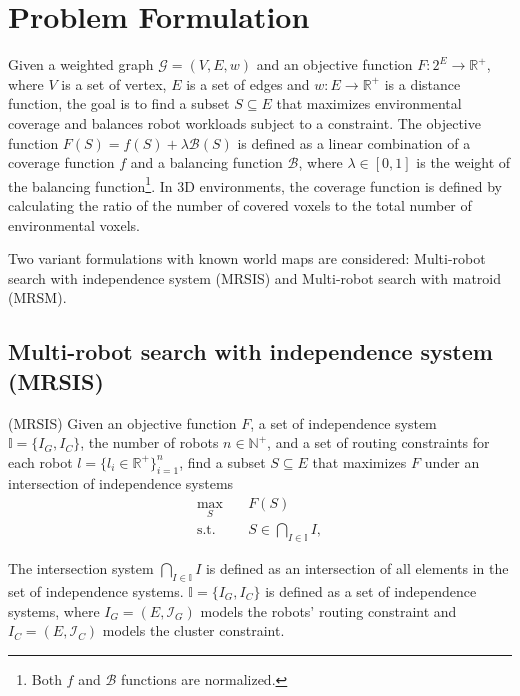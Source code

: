 \chapter{Problem Formulation}
Given a weighted graph $\mathcal{G}=(V, E, w)$ and an objective function $F:2^E \rightarrow \mathbb{R}^+$, where $V$ is a set of vertex, $E$ is a set of edges and $w:E \rightarrow \mathbb{R}^+$ is a distance function, the goal is to find a subset $S \subseteq E$ that maximizes environmental coverage and balances robot workloads subject to a constraint.
The objective function $F(S)=f(S)+\lambda \mathcal{B}(S)$ \cite{li2024mrsis} is defined as a linear combination of a coverage function $f$ and a balancing function $\mathcal{B}$, where $\lambda \in [0,1]$ is the weight of the balancing function\footnote{Both $f$ and $\mathcal{B}$ functions are normalized.}.
In 3D environments, the coverage function is defined by calculating the ratio of the number of covered voxels to the total number of environmental voxels.

Two variant formulations with known world maps are considered: Multi-robot search with independence system (MRSIS) \cite{li2024mrsis} and Multi-robot search with matroid (MRSM). \\

\section{Multi-robot search with independence system (MRSIS)}
\begin{problem} \label{prob:objective-IS}
    (MRSIS) \cite{li2024mrsis} Given an objective function $F$, a set of independence system $\mathit{\mathbb{I}} = \{I_G , I_C\}$, the number of robots $n \in \mathbb{N}^+$, and a set of routing constraints for each robot $l = \{l_i \in \mathbb{R}^+\}_{i=1}^n$, find a subset $S \subseteq E$ that maximizes $F$ under an intersection of independence systems
    \begin{equation} \label{eq:objective-IS}
        \begin{aligned}
            \max_{S} \quad & F(S) \\
            \textrm{s.t.} \quad & S \in \bigcap_{I \in \mathit{\mathbb{I}}} I,
        \end{aligned}
\end{equation}
\end{problem}

The intersection system $\bigcap_{I \in \mathit{\mathbb{I}}} I$ is defined as an intersection of all elements in the set of independence systems.
$\mathit{\mathbb{I}} = \{I_G , I_C\}$ is defined as a set of independence systems, where $I_G=(E, \mathcal{I}_G)$ models the robots' routing constraint and $I_C=(E, \mathcal{I}_C)$ models the cluster constraint.\\


